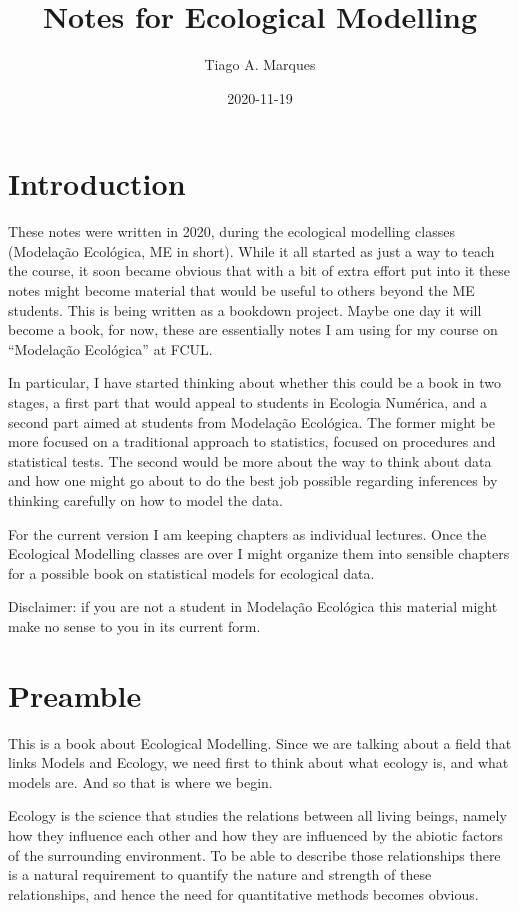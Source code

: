 \documentclass[
]{book}
\title{Notes for Ecological Modelling}
\author{Tiago A. Marques}
\date{2020-11-19}
\begin{document}
\maketitle

{
\setcounter{tocdepth}{1}
\tableofcontents
}
\hypertarget{introduction}{%
\chapter{Introduction}\label{introduction}}

These notes were written in 2020, during the ecological modelling classes (Modelação Ecológica, ME in short). While it all started as just a way to teach the course, it soon became obvious that with a bit of extra effort put into it these notes might become material that would be useful to others beyond the ME students. This is being written as a bookdown project. Maybe one day it will become a book, for now, these are essentially notes I am using for my course on ``Modelação Ecológica'' at FCUL.

In particular, I have started thinking about whether this could be a book in two stages, a first part that would appeal to students in Ecologia Numérica, and a second part aimed at students from Modelação Ecológica. The former might be more focused on a traditional approach to statistics, focused on procedures and statistical tests. The second would be more about the way to think about data and how one might go about to do the best job possible regarding inferences by thinking carefully on how to model the data.

For the current version I am keeping chapters as individual lectures. Once the Ecological Modelling classes are over I might organize them into sensible chapters for a possible book on statistical models for ecological data.

Disclaimer: if you are not a student in Modelação Ecológica this material might make no sense to you in its current form.

\hypertarget{mainintro}{%
\chapter{Preamble}\label{mainintro}}

This is a book about Ecological Modelling. Since we are talking about a field that links Models and Ecology, we need first to think about what ecology is, and what models are. And so that is where we begin.

Ecology is the science that studies the relations between all living beings, namely how they influence each other and how they are influenced by the abiotic factors of the surrounding environment. To be able to describe those relationships there is a natural requirement to quantify the nature and strength of these relationships, and hence the need for quantitative methods becomes obvious.
\end{document}
